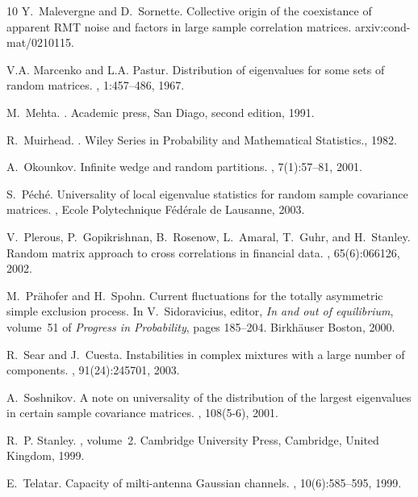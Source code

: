 \documentclass[11pt]{article}
\begin{document}
\begin{thebibliography}{10}
Y.~Malevergne and D.~Sornette.
\newblock Collective origin of the coexistance of apparent {RMT} noise and
  factors in large sample correlation matrices.
\newblock arxiv:cond-mat/0210115.

V.A. Marcenko and L.A. Pastur.
\newblock Distribution of eigenvalues for some sets of random matrices.
, 1:457--486, 1967.

M.~Mehta.
.
\newblock Academic press, San Diago, second edition, 1991.

R.~Muirhead.
.
\newblock Wiley Series in Probability and Mathematical Statistics., 1982.

A.~Okounkov.
\newblock Infinite wedge and random partitions.
, 7(1):57--81, 2001.

S.~P{\'e}ch{\'e}.
\newblock Universality of local eigenvalue statistics for random sample
  covariance matrices.
, Ecole Polytechnique F{\'e}d{\'e}rale de Lausanne,
  2003.

V.~Plerous, P.~Gopikrishnan, B.~Rosenow, L.~Amaral, T.~Guhr, and
H.~Stanley.
\newblock Random matrix approach to cross correlations in financial data.
, 65(6):066126, 2002.

M.~Pr{\"a}hofer and H.~Spohn.
\newblock Current fluctuations for the totally asymmetric simple exclusion
  process.
\newblock In V.~Sidoravicius, editor, {\em In and out of equilibrium},
  volume~51 of {\em Progress in Probability}, pages 185--204. Birkh{\"a}user
  Boston, 2000.

R.~Sear and J.~Cuesta.
\newblock Instabilities in complex mixtures with a large number of components.
, 91(24):245701, 2003.

A.~Soshnikov.
\newblock A note on universality of the distribution of the largest eigenvalues
  in certain sample covariance matrices.
, 108(5-6), 2001.

R.~P. Stanley.
, volume~2.
\newblock Cambridge University Press, Cambridge, United Kingdom, 1999.

E.~Telatar.
\newblock Capacity of milti-antenna {G}aussian channels.
, 10(6):585--595,
  1999.


\end{thebibliography}
\end{document}
